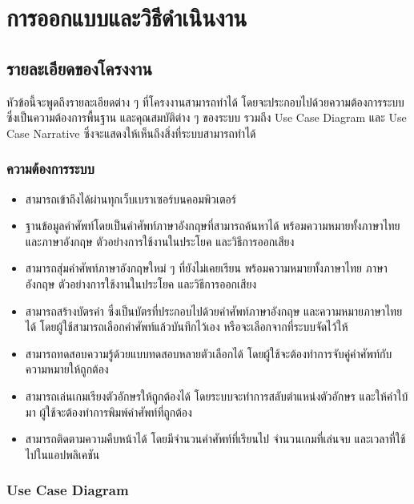 \documentclass[12pt,oneside,openright,a4paper]{cpe-thai-project}
\begin{document}

\chapter{การออกแบบและวิธีดำเนินงาน}

\section{รายละเอียดของโครงงาน}
\hspace{1cm}
หัวข้อนี้จะพูดถึงรายละเอียดต่าง ๆ ที่โครงงานสามารถทำได้ โดยจะประกอบไปด้วยความต้องการระบบ
ซึ่งเป็นความต้องการพื้นฐาน และคุณสมบัติต่าง ๆ ของระบบ รวมถึง Use Case Diagram
และ Use Case Narrative ซึ่งจะแสดงให้เห็นถึงสิ่งที่ระบบสามารถทำได้

\subsection{ความต้องการระบบ}
\begin{itemize}
	\item สามารถเข้าถึงได้ผ่านทุกเว็บเบราเซอร์บนคอมพิวเตอร์
	\item ฐานข้อมูลคำศัพท์โดยเป็นคำศัพท์ภาษาอังกฤษที่สามารถค้นหาได้ พร้อมความหมายทั้งภาษาไทยและภาษาอังกฤษ ตัวอย่างการใช้งานในประโยค และวิธีการออกเสียง
	\item สามารถสุ่มคำศัพท์ภาษาอังกฤษใหม่ ๆ ที่ยังไม่เคยเรียน พร้อมความหมายทั้งภาษาไทย ภาษาอังกฤษ ตัวอย่างการใช้งานในประโยค และวิธีการออกเสียง
	\item สามารถสร้างบัตรคำ ซึ่งเป็นบัตรที่ประกอบไปด้วยคำศัพท์ภาษาอังกฤษ และความหมายภาษาไทยได้ โดยผู้ใช้สามารถเลือกคำศัพท์แล้วบันทึกไว้เอง หรือจะเลือกจากที่ระบบจัดไว้ให้
	\item สามารถทดสอบความรู้ด้วยแบบทดสอบหลายตัวเลือกได้ โดยผู้ใช้จะต้องทำการจับคู่คำศัพท์กับความหมายให้ถูกต้อง
	\item สามารถเล่นเกมเรียงตัวอักษรให้ถูกต้องได้ โดยระบบจะทำการสลับตำแหน่งตัวอักษร และให้คำใบ้มา ผู้ใช้จะต้องทำการพิมพ์คำศัพท์ที่ถูกต้อง
	\item สามารถติดตามความคืบหน้าได้ โดยมีจำนวนคำศัพท์ที่เรียนไป จำนวนเกมที่เล่นจบ และเวลาที่ใช้ไปในแอปพลิเคชัน
\end{itemize}

\pagebreak
\subsection{Use Case Diagram}
\end{document}

